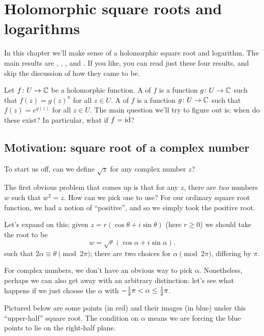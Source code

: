 \chapter{Holomorphic square roots and logarithms}
\label{ch:complex_log}
In this chapter we'll make sense of a holomorphic square root and logarithm.
The main results are , ,
, and .
If you like, you can read just these four results, and skip the discussion of how they came to be.

Let $f \colon U \to \mathbb C$ be a holomorphic function.
A  of $f$ is a function $g \colon U \to \mathbb C$
such that $f(z) = g(z)^n$ for all $z \in U$.
A  of $f$ is a function $g \colon U \to \mathbb C$
such that $f(z) = e^{g(z)}$ for all $z \in U$.
The main question we'll try to figure out is: when do these exist?
In particular, what if $f = \mathrm{id}$?

\section{Motivation: square root of a complex number}
To start us off, can we define $\sqrt z$ for any complex number $z$?

The first obvious problem that comes up is that for any $z$, there are
\emph{two} numbers $w$ such that $w^2 = z$.
How can we pick one to use?
For our ordinary square root function, we had a notion of ``positive'',
and so we simply took the positive root.

Let's expand on this: given
$ z = r \left( \cos\theta + i \sin\theta \right) $
(here $r \ge 0$) we should take the root to be
\[ w = \sqrt{r} \left( \cos \alpha + i \sin \alpha \right). \]
such that $2\alpha \equiv \theta \pmod{2\pi}$;
there are two choices for $\alpha \pmod{2\pi}$, differing by $\pi$.

For complex numbers, we don't have an obvious way to pick $\alpha$.
Nonetheless, perhaps we can also get away with an arbitrary distinction:
let's see what happens if we just choose the $\alpha$ with $-\frac{1}{2}\pi < \alpha \le \frac{1}{2}\pi$.

Pictured below are some points (in red)
and their images (in blue) under this ``upper-half'' square root.
The condition on $\alpha$ means we are forcing the blue points to lie on the right-half plane.

